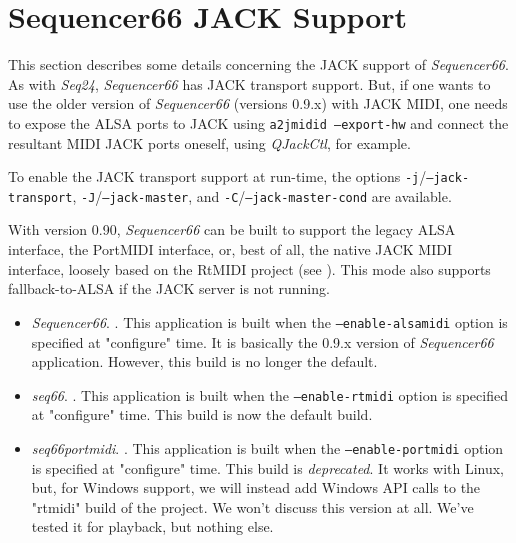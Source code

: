 %
%
%

\section{Sequencer66 JACK Support}
\label{sec:seq66_jack}

   This section describes some details concerning the JACK support of
   \textsl{Sequencer66}.
   As with \textsl{Seq24}, \textsl{Sequencer66} has JACK transport support.
   But, if one wants to use the older version of \textsl{Sequencer66} (versions
   0.9.x) with JACK MIDI, one needs to expose the ALSA ports to JACK using
   \texttt{a2jmidid --export-hw} and connect the resultant MIDI JACK ports
   oneself, using \textsl{QJackCtl}, for example.

   To enable the JACK transport support at run-time, the options
   \texttt{-j}/\texttt{--jack-transport}, \texttt{-J}/\texttt{--jack-master},
   and \texttt{-C}/\texttt{--jack-master-cond} are available.

   With version 0.90, \textsl{Sequencer66} can be built to support the legacy
   ALSA interface, the PortMIDI interface, or, best of all, the native JACK
   MIDI interface, loosely based on the RtMIDI project
   (see \cite{rtmidi}).  This mode also supports fallback-to-ALSA if the JACK
   server is not running.

   \begin{itemize}
      \item \textsl{Sequencer66}.
         .
         This application is built when the
         \texttt{--enable-alsamidi} option is specified at "configure" time.
         It is basically the 0.9.x version of \textsl{Sequencer66} application.
         However, this build is no longer the default.
      \item \textsl{seq66}.
         .
         This application is built when the
         \texttt{--enable-rtmidi} option is specified at "configure" time.
         This build is now the default build.
      \item \textsl{seq66portmidi}.
         .
         This application is built when the
         \texttt{--enable-portmidi} option is specified at "configure" time.
         This build is \textsl{deprecated}.  It works with Linux, but, for
         Windows support, we will instead add Windows API calls to the "rtmidi"
         build of the project.  We won't discuss this version at all.  We've
         tested it for playback, but nothing else.
   \end{itemize}

